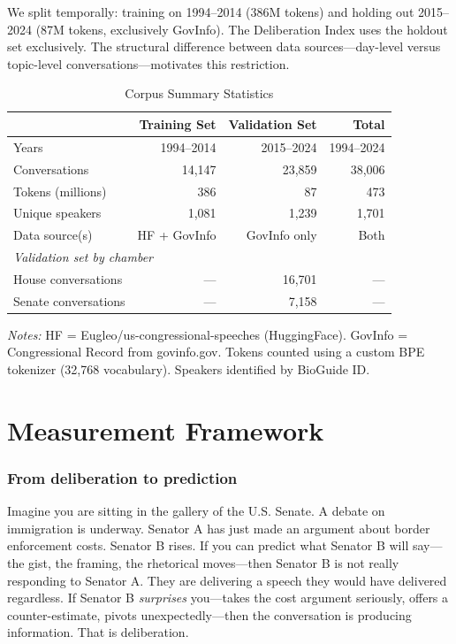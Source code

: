 \documentclass[12pt]{article}
\begin{document}
We split temporally: training on 1994--2014 (386M tokens) and holding out 2015--2024 (87M tokens, exclusively GovInfo). The Deliberation Index uses the holdout set exclusively. The structural difference between data sources---day-level versus topic-level conversations---motivates this restriction.

\begin{table}[H]
\centering
\caption{Corpus Summary Statistics}
\label{tab:corpus}
\begin{threeparttable}
\begin{tabular}{lrrr}
\toprule
& Training Set & Validation Set & Total \\
\midrule
Years & 1994--2014 & 2015--2024 & 1994--2024 \\
Conversations & 14,147 & 23,859 & 38,006 \\
Tokens (millions) & 386 & 87 & 473 \\
Unique speakers & 1,081 & 1,239 & 1,701 \\
Data source(s) & HF + GovInfo & GovInfo only & Both \\
\midrule
\multicolumn{4}{l}{\textit{Validation set by chamber}} \\
\quad House conversations & --- & 16,701 & --- \\
\quad Senate conversations & --- & 7,158 & --- \\
\bottomrule
\end{tabular}
\begin{tablenotes}[flushleft]
\small
\item \textit{Notes:} HF = Eugleo/us-congressional-speeches (HuggingFace). GovInfo = Congressional Record from govinfo.gov. Tokens counted using a custom BPE tokenizer (32,768 vocabulary). Speakers identified by BioGuide ID.
\end{tablenotes}
\end{threeparttable}
\end{table}


\section{Measurement Framework}

\subsubsection*{From deliberation to prediction}
Imagine you are sitting in the gallery of the U.S. Senate. A debate on immigration is underway. Senator A has just made an argument about border enforcement costs. Senator B rises. If you can predict what Senator B will say---the gist, the framing, the rhetorical moves---then Senator B is not really responding to Senator A. They are delivering a speech they would have delivered regardless. If Senator B \textit{surprises} you---takes the cost argument seriously, offers a counter-estimate, pivots unexpectedly---then the conversation is producing information. That is deliberation.
\end{document}
